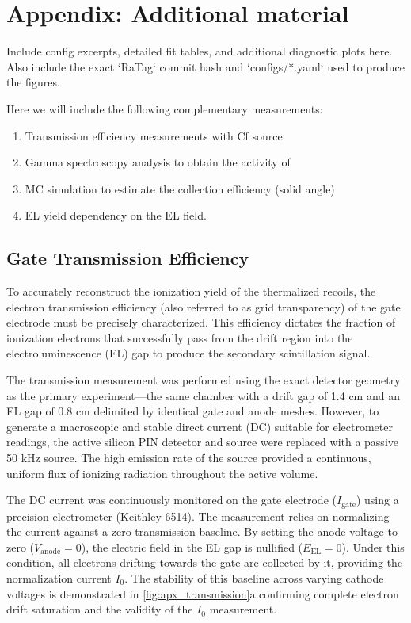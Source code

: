 \section{Appendix: Additional material}
\label{sec:appendix}

Include config excerpts, detailed fit tables, and additional diagnostic plots here. Also include
the exact `RaTag` commit hash and `configs/*.yaml` used to produce the figures.

Here we will include the following complementary measurements:
\begin{enumerate}
    \item Transmission efficiency measurements with Cf source
    \item Gamma spectroscopy analysis to obtain the activity of 
    \item MC simulation to estimate the collection efficiency (solid angle)
    \item EL yield dependency on the EL field.
\end{enumerate}

\subsection{Gate Transmission Efficiency}

To accurately reconstruct the ionization yield of the thermalized  recoils, the
electron transmission efficiency (also referred to as grid transparency) of the gate electrode must
be precisely characterized. This efficiency dictates the fraction of ionization electrons that
successfully pass from the drift region into the electroluminescence (EL) gap to produce the
secondary scintillation signal.

The transmission measurement was performed using the exact detector geometry as the primary
experiment—the same chamber with a drift gap of 1.4 cm and an EL gap of 0.8 cm delimited by
identical gate and anode meshes. However, to generate a macroscopic and stable direct current (DC)
suitable for electrometer readings, the active silicon PIN detector and  source
were replaced with a passive 50 kHz  source. The high emission rate of the
 source provided a continuous, uniform flux of ionizing radiation throughout the
active volume.

The DC current was continuously monitored on the gate electrode ($I_{\text{gate}}$) using a
precision electrometer (Keithley 6514). The measurement relies on normalizing the current against a
zero-transmission baseline. By setting the anode voltage to zero ($V_{\text{anode}} = 0$), the
electric field in the EL gap is nullified ($E_{\text{EL}} = 0$). Under this condition, all
electrons drifting towards the gate are collected by it, providing the normalization current
$I_{0}$. The stability of this baseline across varying cathode voltages is demonstrated in
\ref{fig:apx_transmission}a confirming complete electron drift saturation and the validity of the
$I_0$ measurement.

